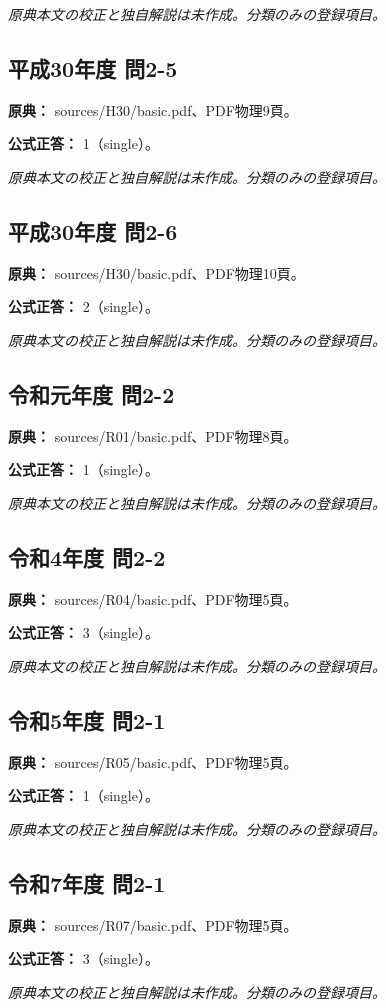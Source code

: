 \par\textit{原典本文の校正と独自解説は未作成。分類のみの登録項目。}

\subsection{平成30年度 問2-5}
\label{q:h30-reg-basic-2-5}

\noindent\textbf{原典：} sources/H30/basic.pdf、PDF物理9頁。

\textbf{公式正答：} 1（single）。

\par\textit{原典本文の校正と独自解説は未作成。分類のみの登録項目。}

\subsection{平成30年度 問2-6}
\label{q:h30-reg-basic-2-6}

\noindent\textbf{原典：} sources/H30/basic.pdf、PDF物理10頁。

\textbf{公式正答：} 2（single）。

\par\textit{原典本文の校正と独自解説は未作成。分類のみの登録項目。}

\subsection{令和元年度 問2-2}
\label{q:r01-reg-basic-2-2}

\noindent\textbf{原典：} sources/R01/basic.pdf、PDF物理8頁。

\textbf{公式正答：} 1（single）。

\par\textit{原典本文の校正と独自解説は未作成。分類のみの登録項目。}

\subsection{令和4年度 問2-2}
\label{q:r04-reg-basic-2-2}

\noindent\textbf{原典：} sources/R04/basic.pdf、PDF物理5頁。

\textbf{公式正答：} 3（single）。

\par\textit{原典本文の校正と独自解説は未作成。分類のみの登録項目。}

\subsection{令和5年度 問2-1}
\label{q:r05-reg-basic-2-1}

\noindent\textbf{原典：} sources/R05/basic.pdf、PDF物理5頁。

\textbf{公式正答：} 1（single）。

\par\textit{原典本文の校正と独自解説は未作成。分類のみの登録項目。}

\subsection{令和7年度 問2-1}
\label{q:r07-reg-basic-2-1}

\noindent\textbf{原典：} sources/R07/basic.pdf、PDF物理5頁。

\textbf{公式正答：} 3（single）。

\par\textit{原典本文の校正と独自解説は未作成。分類のみの登録項目。}
